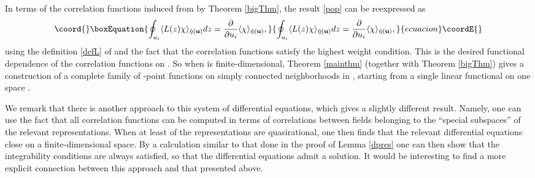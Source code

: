 \documentclass[a4paper,12pt]{article}
\providecommand{\uu}{{\mathbf u}}
\providecommand{\vv}{{\mathbf v}}
\providecommand{\F}{{\mathcal H}}
\providecommand{\IP}[1]{\langle#1\rangle}
\providecommand{\dwrt}[1]{\frac{\partial}{\partial#1}}
\providecommand{\etat}{\tilde{\eta}}
\begin{document}
In terms of the correlation functions induced from \myHighlight{$\etat(\uu)$}\coordHE{} by Theorem \ref{bigThm}, the result \eqref{pop} can be reexpressed as
\begin{equation}\coord{}\boxEquation{
\oint_{u_i} \IP{L(z) \chi}_{\etat(\uu)} dz = \dwrt{u_i} \IP{\chi}_{\etat(\uu)},
}{
\oint_{u_i} \IP{L(z) \chi}_{\etat(\uu)} dz = \dwrt{u_i} \IP{\chi}_{\etat(\uu)},
}{ecuacion}\coordE{}\end{equation}
using the definition \eqref{defL} of \coordHE{} and the fact that the correlation
functions satisfy the highest weight condition.
This is the desired functional dependence of the correlation functions on \myHighlight{$\uu$}\coordHE{}.  So when \myHighlight{$\F/C_k$}\coordHE{} is finite-dimensional,
Theorem \ref{mainthm} (together with Theorem \ref{bigThm}) 
gives a construction of a complete family of \coordHE{}-point functions on simply connected neighborhoods in \coordHE{}, 
starting from a single linear functional on one
space \myHighlight{$A_\vv$}\coordHE{}.

We remark that there is another approach to this system of differential equations, which gives a slightly different
result.  Namely, one can use the fact that all correlation functions \myHighlight{$\IP{\prod_{a=1}^k W(\phi_a, u_a)}$}\coordHE{} can be computed
in terms of correlations between fields \coordHE{} belonging to the ``special subspaces'' \cite{Nahm2} of the \coordHE{} relevant 
representations.  When at least \coordHE{} of the representations are quasirational, one then finds that
the relevant differential equations close on a finite-dimensional space.  By a calculation similar
to that done in the proof of Lemma \ref{dpres} one
can then show that the integrability conditions are always satisfied, so
that the differential equations admit a solution.
It would be interesting to find a more explicit connection between this approach
and that presented above.
\end{document}
